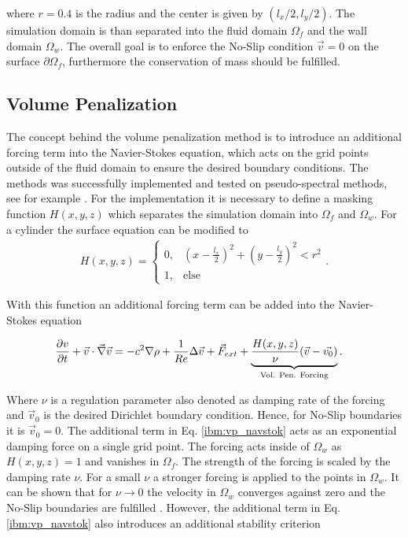 where $r=0.4$ is the radius and the center is given by $(l_x/2, l_y/2)$.
The simulation domain is than separated into the fluid domain $\Omega_f$ and the wall domain $\Omega_w$.
The overall goal is to enforce the No-Slip condition $\vec{v} = 0$ on the surface $\partial \Omega_f$, furthermore
the conservation of mass should be fulfilled.


\subsection{Volume Penalization}
\label{chap:ibm_volpen}
The concept behind the volume penalization method is to introduce an additional forcing term into the Navier-Stokes equation, which acts on
the grid points outside of the fluid domain to ensure the desired boundary conditions. The methods was successfully implemented and tested
on pseudo-spectral methods, see for example \citep{Lulff2011}.
For the implementation it is necessary to define a masking function $H(x, y, z)$ which separates the simulation domain into $\Omega_f$ and $\Omega_w$.
For a cylinder the surface equation \label{ibm:eq_cylinder_intro} can be modified to
\begin{align}
    \label{ibm:masking_function}
H(x, y, z) = \begin{cases}
                    0, &  \left(x - \frac{l_x}{2}\right)^2 + \left(y - \frac{l_y}{2}\right)^2 <r^2\\
                    1, & \text{else}
             \end{cases}.
\end{align}

With this function an additional forcing term can be added into the Navier-Stokes equation

\begin{align}
    \label{ibm:vp_navstok}
    \pdn[v]{t} + \vec{v} \cdot \vec{\nabla} \vec{v} &= -c^2 \nabla \rho + \frac{1}{Re} \Delta \vec{v} + \vec{F}_{ext}
     +\underbrace{ \frac{H(x, y, z)}{\nu}(\vec{v} - \vec{v_0})}_{\text{Vol. Pen. Forcing}}.
\end{align}

Where $\nu$ is a regulation parameter also denoted as damping rate of the forcing and $\vec{v}_0$ is the desired Dirichlet boundary condition.
Hence, for No-Slip boundaries it is $\vec{v}_0 = 0 $.
The additional term in Eq. \ref{ibm:vp_navstok} acts as an exponential damping force on a single grid point.
The forcing acts inside of $\Omega_w$ as $H(x, y, z) = 1$ and vanishes in $\Omega_f$.
The strength of the forcing is scaled by the damping rate $\nu$.
For a small $\nu$ a stronger forcing is applied to the points in $\Omega_w$.
It can be shown that for $\nu\rightarrow 0$ the velocity in $\Omega_w$ converges against zero
and the No-Slip boundaries are fulfilled \citep{Lulff2011}.
However, the additional term in Eq. \ref{ibm:vp_navstok}
also introduces an additional stability criterion \citep{Lulff2011}

